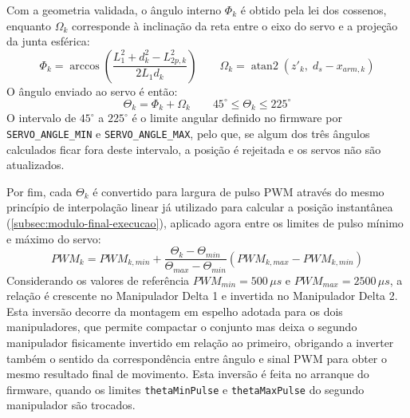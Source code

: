 Com a geometria validada, o ângulo interno \(\Phi_k\) é obtido pela lei dos cossenos, enquanto \(\Omega_k\) corresponde à inclinação da reta entre o eixo do servo e a projeção da junta esférica:
\[
  \Phi_k=
  \arccos\!\left(
    \frac{L_1^2+d_k^2-L_{2p,k}^2}{2L_1d_k}
  \right)
  \qquad
  \Omega_k=
  \operatorname{atan2}\!\left(z'_k,\;d_s-x_{arm,k}\right)
\]
O ângulo enviado ao servo é então:
\[
  \Theta_k=\Phi_k+\Omega_k
  \qquad
  45^\circ \le \Theta_k \le 225^\circ
\]
O intervalo de \(45^\circ\) a \(225^\circ\) é o limite angular definido no firmware por \texttt{SERVO\_ANGLE\_MIN} e \texttt{SERVO\_ANGLE\_MAX}, pelo que, se algum dos três ângulos calculados ficar fora deste intervalo, a posição é rejeitada e os servos não são atualizados.

Por fim, cada \(\Theta_k\) é convertido para largura de pulso PWM através do mesmo princípio de interpolação linear já utilizado para calcular a posição instantânea (\cref{subsec:modulo-final-execucao}), aplicado agora entre os limites de pulso mínimo e máximo do servo:
\[
  PWM_k =
  PWM_{k,min}+
  \frac{\Theta_k-\Theta_{min}}{\Theta_{max}-\Theta_{min}}
  \left(PWM_{k,max}-PWM_{k,min}\right)
\]
Considerando os valores de referência \(PWM_{min}=500\,\mu s\) e \(PWM_{max}=2500\,\mu s\), a relação é crescente no Manipulador Delta 1 e invertida no Manipulador Delta 2. Esta inversão decorre da montagem em espelho adotada para os dois manipuladores, que permite compactar o conjunto mas deixa o segundo manipulador fisicamente invertido em relação ao primeiro, obrigando a inverter também o sentido da correspondência entre ângulo e sinal PWM para obter o mesmo resultado final de movimento. Esta inversão é feita no arranque do firmware, quando os limites \texttt{thetaMinPulse} e \texttt{thetaMaxPulse} do segundo manipulador são trocados.

